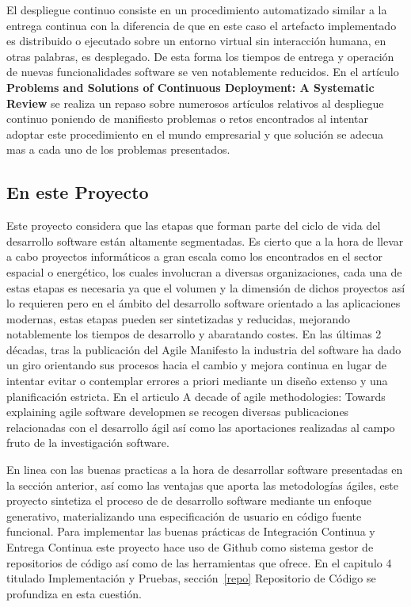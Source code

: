 \documentclass[a4paper,11pt]{book}
\begin{document}
El despliegue continuo consiste en un procedimiento automatizado similar a la entrega continua con la diferencia de que en este caso el artefacto implementado es distribuido o ejecutado sobre un entorno virtual sin interacción humana, en otras palabras, es desplegado.  De esta forma los tiempos de entrega y operación de nuevas funcionalidades software se ven notablemente reducidos. En el artículo \textbf{Problems and Solutions of Continuous Deployment: A Systematic Review}\cite{cdpl} se realiza un repaso sobre numerosos artículos relativos al despliegue continuo  poniendo de manifiesto problemas o retos encontrados al intentar adoptar este procedimiento en el mundo empresarial y que  
solución se adecua mas a cada uno de los problemas presentados. 

\subsection{En este Proyecto}

Este proyecto considera que las etapas que forman parte del ciclo de vida del desarrollo software están altamente segmentadas. Es cierto que a la hora de llevar a cabo proyectos informáticos a gran escala como los encontrados en el sector espacial o energético, los cuales involucran a diversas organizaciones,  cada una de estas etapas es necesaria ya que el volumen y la dimensión de dichos proyectos así lo requieren pero en el ámbito del desarrollo software orientado a las aplicaciones modernas, estas etapas pueden ser sintetizadas y reducidas, mejorando notablemente los tiempos de desarrollo y abaratando costes.  En las últimas 2 décadas, tras la publicación del Agile Manifesto\cite{agile} la industria del software ha dado un giro orientando sus procesos hacia el cambio y mejora continua en lugar de intentar evitar o contemplar errores a priori mediante un diseño extenso y una planificación estricta.  En el articulo A decade of agile methodologies: Towards explaining agile software developmen\cite{decada} se recogen  diversas publicaciones relacionadas con el desarrollo ágil así como las aportaciones realizadas al campo fruto de la investigación software. 


En linea con las buenas practicas a la hora de desarrollar software presentadas en la sección anterior,  así como las ventajas que aporta las metodologías ágiles, este proyecto sintetiza el proceso de de desarrollo software mediante un enfoque generativo, materializando una especificación de usuario en código fuente funcional.  Para implementar las buenas prácticas de Integración Continua y Entrega Continua este proyecto hace uso de Github como sistema gestor de repositorios de código así como de las herramientas que ofrece. En el capitulo 4 titulado Implementación y Pruebas, sección~\ref{repo}  Repositorio de Código se profundiza en esta cuestión. 
\end{document}
